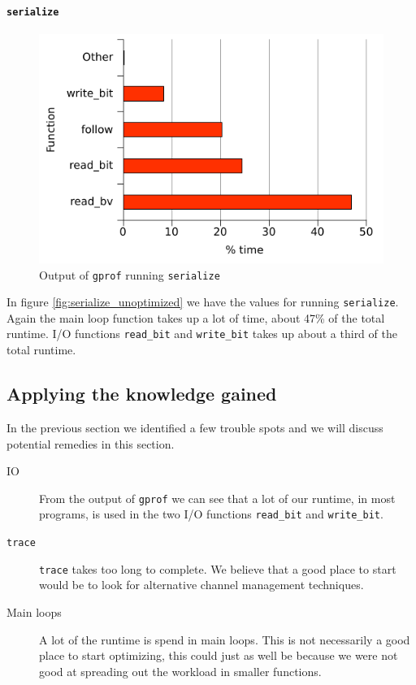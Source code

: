\paragraph{\texttt{serialize}}
\begin{figure}
  \centering
  \includegraphics{optimizations/serialize_unoptimized.pdf}
  \caption{Output of \texttt{gprof} running \texttt{serialize}}
  \label{fig:serialize_unoptimized}
\end{figure}
In figure \vref{fig:serialize_unoptimized} we have the values for
running \texttt{serialize}. Again the main loop function takes up a
lot of time, about 47\% of the total runtime. I/O functions
\lstinline{read_bit} and \lstinline{write_bit} takes up about a third
of the total runtime.

\subsection{Applying the knowledge gained}

In the previous section we identified a few trouble spots and we will
discuss potential remedies in this section.
\begin{description}
\item[IO] From the output of \texttt{gprof} we can see that a lot of
  our runtime, in most programs, is used in the two I/O functions
  \lstinline{read_bit} and \lstinline{write_bit}.
\item[\texttt{trace}] \lstinline{trace} takes too long to complete. We believe that a
  good place to start would be to look for alternative 
  channel management techniques.
\item[Main loops] A lot of the runtime is spend in main loops. This is
  not necessarily a good place to start optimizing, this could just as
  well be because we were not good at spreading out the workload in
  smaller functions.
\end{description}


